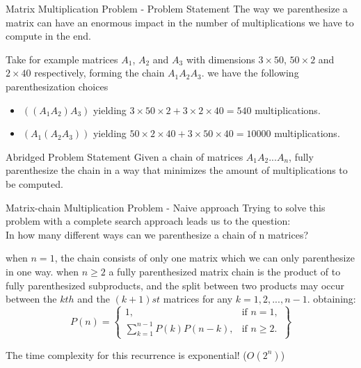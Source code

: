 \begin{frame}[allowframebreaks]{Matrix Multiplication Problem - Problem Statement}
  The way we parenthesize a matrix can have an enormous impact in the number
  of multiplications we have to compute in the end. 
  
  Take for example matrices $A_1$, $A_2$ and $A_3$ with dimensions $3 \times 50$, $50 \times 2$
  and $2 \times 40$ respectively, forming the chain $A_{1}A_{2}A_{3}$. we have the following parenthesization choices
  \\
  \vspace{0.5em}
  \begin{itemize}
    \item $((A_{1}A_{2})A_{3})$ yielding $3 \times 50 \times 2 + 3 \times 2 \times 40 = 540$ multiplications.
    \item  $(A_{1}(A_{2}A_{3}))$ yielding $50 \times 2 \times 40 + 3 \times 50 \times 40 = 10000$ multiplications.
  \end{itemize}

  \framebreak

  \begin{block}{Abridged Problem Statement}
    Given a chain of matrices $A_{1}A_{2}...A_{n}$, fully parenthesize the chain in a way
    that minimizes the amount of multiplications to be computed.
  \end{block}
\end{frame}

\begin{frame}[allowframebreaks]{Matrix-chain Multiplication Problem - Naive approach}
  Trying to solve this problem with a complete search approach leads us to the question:
  \\
  \vspace{1em}
  In how many different ways can we parenthesize a chain of n matrices?

  \framebreak
  when $n = 1$, the chain consists of only one matrix which we can only parenthesize in one way.
  when $n \geq 2$ a fully parenthesized matrix chain is the product of to fully parenthesized
  subproducts, and the split between two products may occur between the $kth$
  and the $(k + 1)st$ matrices for any $k = 1, 2, ..., n - 1 $. obtaining:
    \[
      P(n) = \left\{\begin{array}{lr}
        1, & \text{if } n = 1,\\
        \sum_{k=1}^{n-1}P(k)P(n-k), & \text{if } n \geq 2.
        \end{array}\right\}
    \]
  
  The time complexity for this recurrence is exponential! ($O(2^n)$)
\end{frame}

